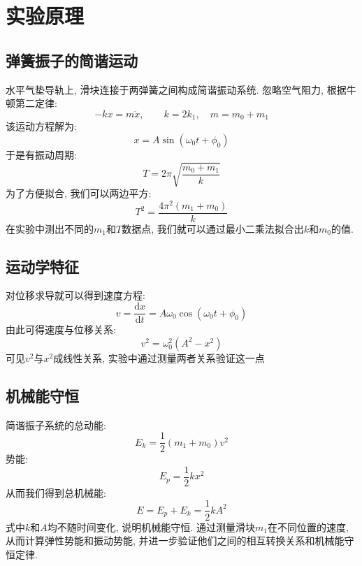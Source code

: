 \documentclass[zihao=5, UTF8]{article}
\renewcommand{\dd}{\mathrm{d}}
\theoremstyle{MyLineTheoremStyle} %
\theoremstyle{MyBlockTheoremStyle} %
\theoremstyle{MySubsubsectionStyle} %
\begin{document}
\section{实验原理}

\subsection{弹簧振子的简谐运动}
水平气垫导轨上, 滑块连接于两弹簧之间构成简谐振动系统. 忽略空气阻力, 根据牛顿第二定律: 
\begin{equation}
-kx = m\ddot{x}, \qquad k = 2k_1, \quad m = m_0 + m_1
\end{equation}
该运动方程解为: 
\begin{equation}
x = A\sin(\omega_0t + \phi_0)
\end{equation}
于是有振动周期: 
\begin{equation}
T = 2\pi\sqrt{\frac{m_0 + m_1}{k}}
\end{equation}
为了方便拟合, 我们可以两边平方: 
\begin{equation}
T^2 = \frac{4\pi^2(m_1 + m_0)}{k}
\end{equation}
在实验中测出不同的$m_1$和$T$数据点, 我们就可以通过最小二乘法拟合出$k$和$m_0$的值. 

\subsection{运动学特征}
对位移求导就可以得到速度方程: 
\begin{equation}
v = \frac{\dd x}{\dd t} = A\omega_0\cos(\omega_0t + \phi_0)
\end{equation}
由此可得速度与位移关系: 
\begin{equation}
v^2 = \omega_0^2(A^2 - x^2)
\end{equation}
可见$v^2$与$x^2$成线性关系, 实验中通过测量两者关系验证这一点

\subsection{机械能守恒}
简谐振子系统的总动能: 
\begin{equation}
E_k = \frac{1}{2}(m_1 + m_0)v^2
\end{equation}
势能: 
\begin{equation}
E_p = \frac{1}{2}kx^2
\end{equation}
从而我们得到总机械能: 
\begin{equation}
E = E_p + E_k = \frac{1}{2}kA^2
\end{equation}
式中$k$和$A$均不随时间变化, 说明机械能守恒. 
通过测量滑块$m_1$在不同位置的速度, 从而计算弹性势能和振动势能, 
并进一步验证他们之间的相互转换关系和机械能守恒定律. 
\end{document}
